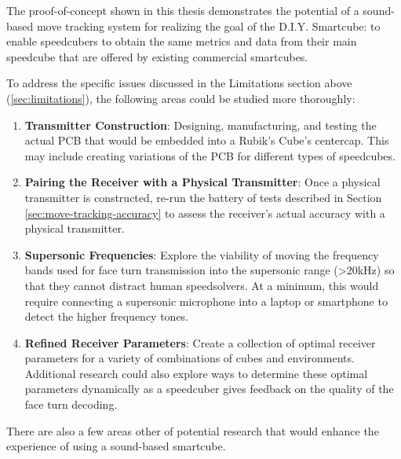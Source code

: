 The proof-of-concept shown in this thesis demonstrates the potential of
a sound-based move tracking system for realizing the goal of the D.I.Y.
Smartcube: to enable speedcubers to obtain the same metrics and data
from their main speedcube that are offered by existing commercial
smartcubes.

To address the specific issues discussed in the Limitations section
above (\ref{sec:limitations}), the following areas could be studied
more thoroughly:

\begin{enumerate}

    \item \textbf{Transmitter Construction}: Designing, manufacturing,
    and testing the actual PCB that would be embedded into a Rubik's
    Cube's centercap. This may include creating variations of the PCB
    for different types of speedcubes.

    \item \textbf{Pairing the Receiver with a Physical Transmitter}: Once
    a physical transmitter is constructed, re-run the battery of tests
    described in Section \ref{sec:move-tracking-accuracy} to assess the
    receiver's actual accuracy with a physical transmitter.

    \item \textbf{Supersonic Frequencies}: Explore the viability of
    moving the frequency bands used for face turn transmission into the
    supersonic range (>20kHz) so that they cannot distract human
    speedsolvers. At a minimum, this would require connecting a
    supersonic microphone into a laptop or smartphone to detect the
    higher frequency tones.

    \item \textbf{Refined Receiver Parameters}: Create a collection of
    optimal receiver parameters for a variety of combinations of cubes
    and environments. Additional research could also explore ways to
    determine these optimal parameters dynamically as a speedcuber
    gives feedback on the quality of the face turn decoding.

\end{enumerate}

There are also a few areas other of potential research that would
enhance the experience of using a sound-based smartcube.

